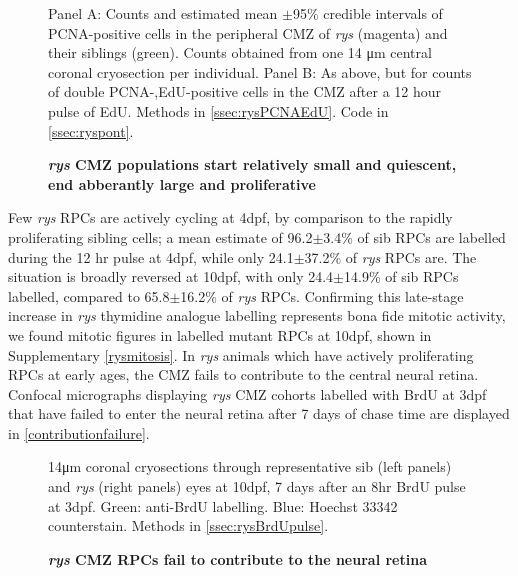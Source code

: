 \begin{figure}[!h]
    \caption{{\bf \textit{rys} CMZ populations start relatively small and quiescent, end abberantly large and proliferative}}
    Panel A: Counts and estimated mean $\pm$95\% credible intervals of PCNA-positive cells in the peripheral CMZ of \textit{rys} (magenta) and their siblings (green). Counts obtained from one 14 \si{\micro\metre} central coronal cryosection per individual.
    Panel B: As above, but for counts of double PCNA-,EdU-positive cells in the CMZ after a 12 hour pulse of EdU.
    \label{rysCMZontogeny}
    Methods in \autoref{ssec:rysPCNAEdU}.
    Code in \autoref{ssec:ryspont}.
\end{figure}
\FloatBarrier

Few \textit{rys} RPCs are actively cycling at 4dpf, by comparison to the rapidly proliferating sibling cells; a mean estimate of 96.2$\pm$3.4\% of sib RPCs are labelled during the 12 hr pulse at 4dpf, while only 24.1$\pm$37.2\% of \textit{rys} RPCs are. The situation is broadly reversed at 10dpf, with only 24.4$\pm$14.9\% of sib RPCs labelled, compared to 65.8$\pm$16.2\% of \textit{rys} RPCs. Confirming this late-stage increase in \textit{rys} thymidine analogue labelling represents bona fide mitotic activity, we found mitotic figures in labelled mutant RPCs at 10dpf, shown in Supplementary \autoref{rysmitosis}. In \textit{rys} animals which have actively proliferating RPCs at early ages, the CMZ fails to contribute to the central neural retina. Confocal micrographs displaying \textit{rys} CMZ cohorts labelled with BrdU at 3dpf that have failed to enter the neural retina after 7 days of chase time are displayed in \autoref{contributionfailure}. 

\begin{figure}[!h]
    \caption{{\bf \textit{rys} CMZ RPCs fail to contribute to the neural retina}}
    14\si{\micro\metre} coronal cryosections through representative sib (left panels) and \textit{rys} (right panels) eyes at 10dpf, 7 days after an 8hr BrdU pulse at 3dpf. Green: anti-BrdU labelling. Blue: Hoechst 33342 counterstain.
    Methods in \autoref{ssec:rysBrdUpulse}.
    \label{contributionfailure}
\end{figure}
\FloatBarrier

